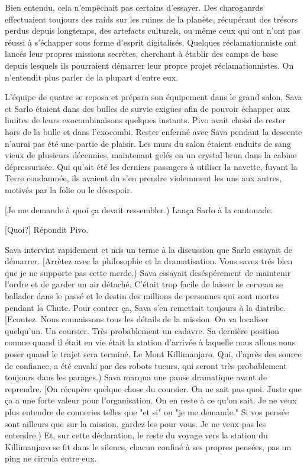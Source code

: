 Bien entendu, cela n'empêchait pas certains d'essayer. Des charoganrds effectuaient toujours des raids sur les ruines de la planète, récupérant des trésors perdus depuis longtemps, des artefacts culturels, ou même ceux qui ont n'ont pas réussi à s'échapper sous forme d'esprit digitalisés. Quelques réclamationniste ont lancés leur propres missions secrètes, cherchant à établir des camps de base depuis lesquels ils pourraient démarrer leur propre projet réclamationnistes. On n'entendit plus parler de la plupart d'entre eux. 

L'équipe de quatre se reposa et prépara son équipement dans le grand salon, Sava et Sarlo étaient dans des bulles de survie exigües afin de pouvoir échapper aux limites de leurs exocombinaisons quelques instants. Pivo avait choisi de rester hors de la bulle et dans l'exocombi. Rester enfermé avec Sava pendant la descente n'aurai pas été une partie de plaisir. Les murs du salon étaient enduits de sang vieux de plusieurs décennies, maintenant gelés en un crystal brun dans la cabine dépressurisée. Qui qu'ait été les derniers passagers à utiliser la navette, fuyant la Terre condamnée, ils avaient du s'en prendre violemment les uns aux autres, motivés par la folie ou le désespoir. 

[Je me demande à quoi ça devait ressembler.) Lança Sarlo à la cantonade. 

[Quoi?] Répondit Pivo. 

Sava intervint rapidement et mis un terme à la discussion que Sarlo essayait de démarrer. [Arrètez avec la philosophie et la dramatisation. Vous savez trés bien que je ne supporte pas cette merde.) Sava essayait deséspérement de maintenir l'ordre et de garder un air détaché. C'était trop facile de laisser le cerveau se ballader dans le passé et le destin des millions de personnes qui sont mortes pendant la Chute. Pour contrer ça, Sava s'en remettait toujours à la diatribe. [Ecoutez. Nous connaissons tous les détails de la mission. On va localiser quelqu'un. Un coursier. Très probablement un cadavre. Sa dernière position connue quand il était en vie était la station d'arrivée à laquelle nous allons nous poser quand le trajet sera terminé. Le Mont Killimanjaro. Qui, d'après des source de confiance, a été envahi par des robots tueurs, qui seront très probablement toujours dans les parages.) Sava marqua une pause dramatique avant de reprendre. [On récupère quelque chose du coursier. On ne sait pas quoi. Juste que ça a une forte valeur pour l'organisation. On en reste à ce qu'on sait. Je ne veux plus entendre de conneries telles que "et si" ou "je me demande." Si vos pensée sont ailleurs que sur la mission, gardez les pour vous. Je ne veux pas les entendre.) Et, sur cette déclaration, le reste du voyage vers la station du Killimanjaro  se fit dans le silence, chacun confiné à ses propres pensées, pas un ping ne circula entre eux. 

